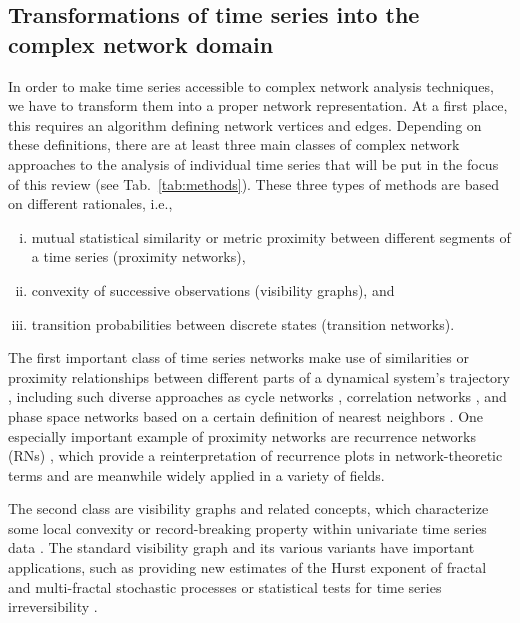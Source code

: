 	\subsection{Transformations of time series into the complex network domain}
	In order to make time series accessible to complex network analysis techniques, we have to transform them into a proper network representation. At a first place, this requires an algorithm defining network vertices and edges. Depending on these definitions, there are at least three main classes of complex network approaches to the analysis of individual time series that will be put in the focus of this review (see Tab.~\ref{tab:methods}). These three types of methods are based on different rationales, i.e.,
\begin{enumerate}[(i)]
\item mutual statistical similarity or metric proximity between different segments of a time series (proximity networks),
\item convexity of successive observations (visibility graphs), and
\item transition probabilities between discrete states (transition networks).
\end{enumerate}

	The first important class of time series networks make use of similarities or proximity relationships between different parts of a dynamical system's trajectory \cite{Marwan2009,Donner2010a,Donner2011}, including such diverse approaches as cycle networks \cite{Zhang2006,Zhang2008e}, correlation networks \cite{Yang2008}, and phase space networks based on a certain definition of nearest neighbors \cite{Xu2008}. One especially important example of proximity networks are recurrence networks (RNs) \cite{Marwan2009,Donner2010a}, which provide a reinterpretation of recurrence plots \cite{marwan2007} in network-theoretic terms and are meanwhile widely applied in a variety of fields. 

	The second class are visibility graphs and related concepts, which characterize some local convexity or record-breaking property within univariate time series data \cite{Lacasa2008,Luque2009,Donner2012}. The standard visibility graph and its various variants have important applications, such as providing new estimates of the Hurst exponent of fractal and multi-fractal stochastic processes \cite{Lacasa2009,Ni2009} or statistical tests for time series irreversibility \cite{Donges2013,Lacasa2012}. 

